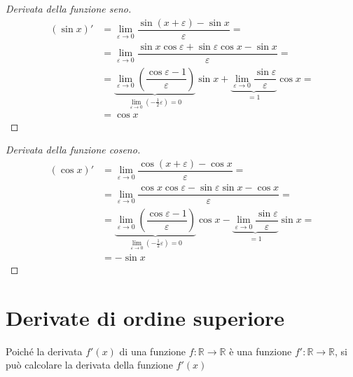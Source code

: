 \begin{proof}[Derivata della funzione seno]
\begin{equation}
    \begin{aligned}
        (\sin x)' 
        & = \lim_{\varepsilon \rightarrow 0 } \dfrac{\sin(x+\varepsilon) - \sin x}{\varepsilon} = \\
        & = \lim_{\varepsilon \rightarrow 0 } \dfrac{\sin x \cos\varepsilon + \sin \varepsilon \cos x - \sin x}{\varepsilon} = \\
        & = \underbrace{\lim_{\varepsilon \rightarrow 0 } \left( \dfrac{ \cos\varepsilon - 1}{\varepsilon} \right) }_{\lim_{\varepsilon \rightarrow 0} \left(-\frac{1}{2} \varepsilon \right) = 0 } \sin x +  \underbrace{\lim_{\varepsilon \rightarrow 0 } \dfrac{\sin \varepsilon}{\varepsilon} }_{= 1} \cos x  = \\
        & = \cos x 
    \end{aligned}
\end{equation}
\end{proof}
\begin{proof}[Derivata della funzione coseno]
\begin{equation}
    \begin{aligned}
        (\cos x)' 
        & = \lim_{\varepsilon \rightarrow 0 } \dfrac{\cos(x+\varepsilon) - \cos x}{\varepsilon} = \\
        & = \lim_{\varepsilon \rightarrow 0 } \dfrac{\cos x \cos\varepsilon - \sin \varepsilon \sin x - \cos x}{\varepsilon} = \\
        & = \underbrace{\lim_{\varepsilon \rightarrow 0 } \left( \dfrac{ \cos\varepsilon - 1}{\varepsilon} \right) }_{\lim_{\varepsilon \rightarrow 0} \left(-\frac{1}{2} \varepsilon \right) = 0 } \cos x -  \underbrace{\lim_{\varepsilon \rightarrow 0 } \dfrac{\sin \varepsilon}{\varepsilon} }_{= 1} \sin x  = \\
        & = - \sin x 
    \end{aligned}
\end{equation}
\end{proof}

\section{Derivate di ordine superiore}
Poiché la derivata $f'(x)$ di una funzione $f: \mathbb{R} \rightarrow \mathbb{R}$ è una funzione $f': \mathbb{R} \rightarrow \mathbb{R}$, si può calcolare la derivata della funzione $f'(x)$

